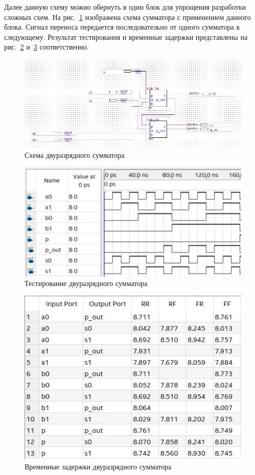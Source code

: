 \documentclass[a4paper,14pt]{article}
\begin{document}
Далее данную схему можно обернуть в один блок для упрощения разработки сложных схем.
На рис.~\ref{fig:schema_2} изображена схема сумматора с применением данного блока. 
Сигнал переноса передается последовательно от одного сумматора к следующему.
Результат тестирования и временные задержки представлены на рис.~\ref{fig:wave_2} и~\ref{fig:time_2} соответственно.

\begin{figure}[H]
	\centering
	\includegraphics[width=\linewidth]{image/schema_2}
	\caption{Схема двуразрядного сумматора}
	\label{fig:schema_2}
\end{figure}

\begin{figure}[H]
	\centering
	\includegraphics[width=0.5\linewidth]{image/wave_2}
	\caption{Тестирование двуразрядного сумматора}
	\label{fig:wave_2}
\end{figure}

\begin{figure}[H]
	\centering
	\includegraphics[width=0.7\linewidth]{image/time_2}
	\caption{Временные задержки двуразрядного сумматора}
	\label{fig:time_2}
\end{figure}
\end{document}

